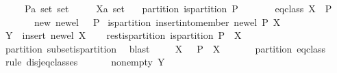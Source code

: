 \begin{isabellebody}
\ \ \ \ \ P{\isacharcolon}{\isacharcolon}{\isachardoublequoteopen}{\isacharprime}a\ set\ set{\isachardoublequoteclose}\isanewline
\ \ \ \ \ X{\isacharcolon}{\isacharcolon}{\isachardoublequoteopen}{\isacharprime}a\ set{\isachardoublequoteclose}\isanewline
\ \ \ partition{\isacharcolon}\ {\isachardoublequoteopen}is{\isacharunderscore}partition\ P{\isachardoublequoteclose}\isanewline
\ \ \ \ \ \ \ eq{\isacharunderscore}class{\isacharcolon}\ {\isachardoublequoteopen}X\ {\isasymin}\ P{\isachardoublequoteclose}\isanewline
\ \ \ \ \ \ \ new{\isacharcolon}\ {\isachardoublequoteopen}new{\isacharunderscore}el\ {\isasymnotin}\ {\isasymUnion}\ P{\isachardoublequoteclose}\isanewline
{}\ {\isachardoublequoteopen}is{\isacharunderscore}partition\ {\isacharparenleft}insert{\isacharunderscore}into{\isacharunderscore}member\ new{\isacharunderscore}el\ P\ X{\isacharparenright}{\isachardoublequoteclose}\isanewline
%
\isadelimproof
%
\endisadelimproof
%
\isatagproof
{}\isamarkupfalse%
\ {\isacharminus}\isanewline
\ \ \isamarkupfalse%
\ {\isacharquery}Y\ {\isacharequal}\ {\isachardoublequoteopen}insert\ new{\isacharunderscore}el\ X{\isachardoublequoteclose}\isanewline
\ \ \isamarkupfalse%
\ rest{\isacharunderscore}is{\isacharunderscore}partition{\isacharcolon}\ {\isachardoublequoteopen}is{\isacharunderscore}partition\ {\isacharparenleft}P\ {\isacharminus}\ {\isacharbraceleft}X{\isacharbraceright}{\isacharparenright}{\isachardoublequoteclose}\isanewline
\ \ \ \ \isamarkupfalse%
\ partition\ subset{\isacharunderscore}is{\isacharunderscore}partition\ \isamarkupfalse%
\ blast\isanewline
\ \ \isamarkupfalse%
\ {\isacharasterisk}{\isacharcolon}\ {\isachardoublequoteopen}X\ {\isasyminter}\ {\isasymUnion}\ {\isacharparenleft}P\ {\isacharminus}\ {\isacharbraceleft}X{\isacharbraceright}{\isacharparenright}\ {\isacharequal}\ {\isacharbraceleft}{\isacharbraceright}{\isachardoublequoteclose}\isanewline
\ \ \ \isamarkupfalse%
\ partition\ eq{\isacharunderscore}class\ \isamarkupfalse%
\ {\isacharparenleft}rule\ disj{\isacharunderscore}eq{\isacharunderscore}classes{\isacharparenright}\isanewline
\ \ \isamarkupfalse%
\ {\isacharasterisk}\ \isamarkupfalse%
\ non{\isacharunderscore}empty{\isacharcolon}\ {\isachardoublequoteopen}{\isacharquery}Y\ {\isasymnoteq}\ {\isacharbraceleft}{\isacharbraceright}{\isachardoublequoteclose}\ \isamarkupfalse%

\end{isabellebody}
